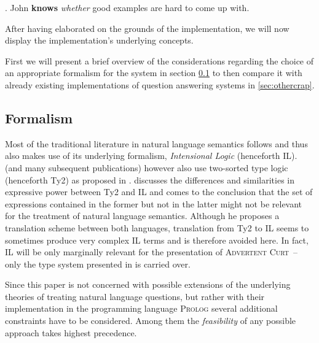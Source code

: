 \documentclass[a4paper,fontsize=12pt]{article}
\newcommand{\abbr}{\textsf} %
\newcommand{\stress}{\textbf} %
\newcommand{\pn}{\textsc} %
\newcommand{\acurt}{\pn{Advertent Curt}\mbox{ }}
\theoremstyle{remark} \newtheorem*{termin}{Definition} %
\begin{document}
\ex. John \stress{knows} \emph{whether} good examples are hard to come up with.

After having elaborated on the grounds of the implementation, we will now
display the implementation's underlying concepts. %


First we will present a brief overview of the considerations regarding the
choice of an appropriate formalism for the system in section \ref{sec:formal}
to then compare it with already existing implementations of question answering
systems in \ref{sec:othercrap}.

\subsection{Formalism}\label{sec:formal}


Most of the traditional literature in natural language semantics follows
\cite{ptq} and thus also makes use of its underlying formalism,
\emph{Intensional Logic} (henceforth \abbr{IL}). \cite{gs:sqpa} (and many subsequent
publications) however also use two-sorted type logic (henceforth \abbr{Ty2}) as
proposed in \cite{gallin:ty2}. \cite{z:ilty2} discusses the differences and
similarities in expressive power between \abbr{Ty2} and \abbr{IL} and comes to
the conclusion that the set of expressions contained in the former but not in
the latter might not be relevant for the treatment of natural language
semantics. Although he proposes a translation scheme between both languages,
translation from \abbr{Ty2} to \abbr{IL} seems to sometimes produce very complex
\abbr{IL} terms and is therefore avoided here. In fact, \abbr{IL} will be only
marginally relevant for the presentation of \acurt -- only the type system
presented in \cite{ptq} is carried over.


Since this paper is not concerned with possible extensions of the underlying
theories of treating natural language questions, but rather with their
implementation in the programming language \pn{Prolog} several additional
constraints have to be considered. Among them the \emph{feasibility} of any
possible approach takes highest precedence.
\end{document}
